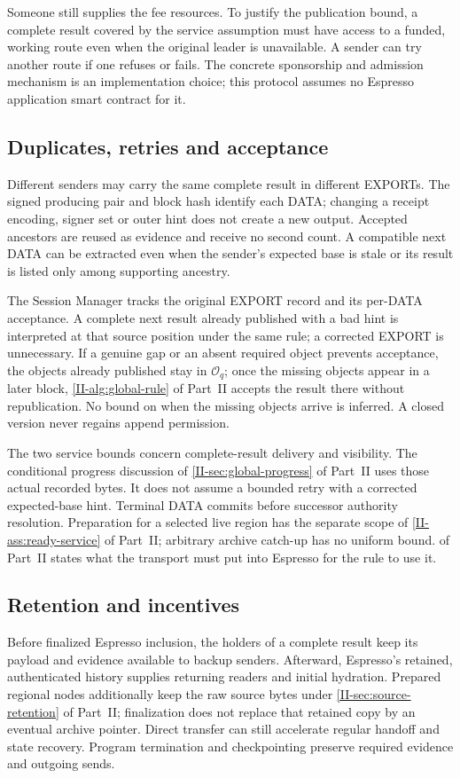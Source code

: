 \documentclass[11pt,a4paper]{article}
\newcounter{protocol}
\begin{document}
Someone still supplies the fee resources. To justify the publication
bound, a complete result covered by the service assumption must have access to a funded,
working route even when the original leader is unavailable. A sender can
try another route if one refuses or fails. The concrete sponsorship and
admission mechanism is an implementation choice; this protocol assumes
no Espresso application smart contract for it.

\subsection{Duplicates, retries and acceptance}
Different senders may carry the same complete result in different EXPORTs.
The signed producing pair and block hash identify each DATA; changing a
receipt encoding, signer set or outer hint does not create a new output.
Accepted ancestors are reused as evidence and receive no second count.
A compatible next DATA can be extracted even when the sender's expected
base is stale or its result is listed only among supporting ancestry.

The Session Manager tracks the original EXPORT record and its per-DATA
acceptance. A complete next result already published with a bad hint is
interpreted at that source position under the same rule; a corrected
EXPORT is unnecessary.
If a genuine gap or an absent required object prevents acceptance, the
objects already published stay in $\mathcal O_q$; once the missing
objects appear in a later block, \cref{II-alg:global-rule} of Part~II accepts the
result there without republication. No bound on when the missing
objects arrive is inferred. A closed version never regains append
permission.

The two service bounds concern complete-result delivery and visibility.
The conditional progress discussion of \cref{II-sec:global-progress} of Part~II
uses those actual recorded bytes. It does not assume a bounded retry
with a corrected expected-base hint. Terminal DATA commits before successor authority
resolution. Preparation for a selected live region has the separate
scope of \cref{II-ass:ready-service} of Part~II; arbitrary archive catch-up has no
uniform bound.  of Part~II states what the transport
must put into Espresso for the rule to use it.

\subsection{Retention and incentives}
Before finalized Espresso inclusion, the holders of a complete result
keep its payload and evidence available to backup senders. Afterward,
Espresso's retained, authenticated history supplies returning readers and
initial hydration. Prepared regional nodes additionally keep the raw
source bytes under \cref{II-sec:source-retention} of Part~II; finalization does not
replace that retained copy by an eventual archive pointer. Direct transfer
can still accelerate regular handoff and state recovery. Program
termination and checkpointing preserve required evidence and outgoing
sends.
\end{document}
